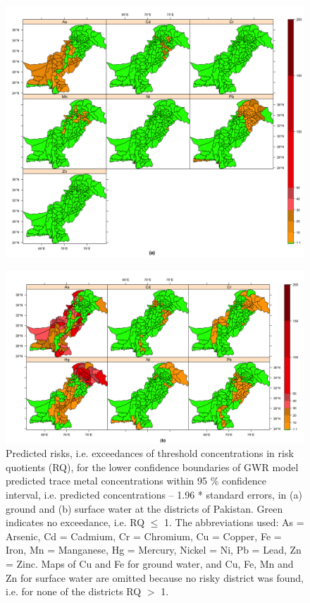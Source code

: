 \newpage

\begin{figure}[hp!]
  \centering
  \includegraphics[width=1.1\textwidth]{Figures/Fig_D_5_a.png}
  \label{Fig_D_5_a}
\end{figure}

\newpage

\begin{figure}[hp!]
  \centering
  \captionsetup{width=1.1\textwidth}
  \hspace{-2cm} \includegraphics[width=1.1\textwidth]{Figures/Fig_D_5_b.png}
  \caption{Predicted risks, i.e. exceedances of threshold concentrations in risk quotients (RQ), for the lower confidence boundaries of GWR model predicted trace metal concentrations within 95 \% confidence interval, i.e. predicted concentrations – 1.96 * standard errors, in (a) ground and (b) surface water at the districts of Pakistan. Green indicates no exceedance, i.e. RQ $\leq$ 1. The abbreviations used: As = Arsenic, Cd = Cadmium, Cr = Chromium, Cu = Copper, Fe = Iron, Mn = Manganese, Hg = Mercury, Nickel = Ni, Pb = Lead, Zn = Zinc. Maps of Cu and Fe for ground water, and Cu, Fe, Mn and Zn for surface water are omitted because no risky district was found, i.e. for none of the districts RQ $>$ 1.}
  \label{Fig_D_5_b}
\end{figure}

